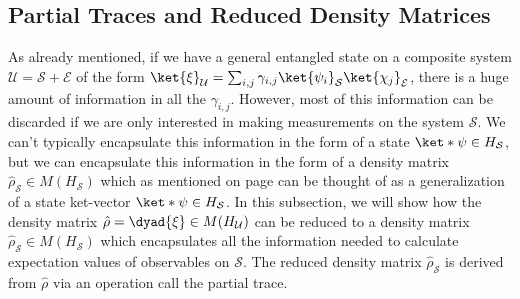     \subsection{Partial Traces and Reduced Density Matrices}
    As already mentioned, if we have a general entangled state on a composite system $\mathcal{U}=\mathcal{S}+\mathcal{E}$ of the form  $\ket{\xi}_\mathcal{U}=\sum_{i,j}\gamma_{i,j}\ket{\psi_i}_\mathcal{S}\ket{\chi_j}_\mathcal{E}$, there is a huge amount of information in all the $\gamma_{i,j}$. However, most of this information can be discarded if we are only interested in making measurements on the system $\mathcal{S}$. We can't typically encapsulate this information in the form of a state $\ket*{\psi}\in H_\mathcal{S}$, but we can encapsulate this information in the form of a density matrix $\hat{\rho}_\mathcal{S}\in M(H_\mathcal{S})$ which as mentioned on page \pageref{genket} can be thought of as a generalization of a state ket-vector $\ket*{\psi}\in H_\mathcal{S}$. In this subsection, we will show how the density matrix $\hat{\rho}=\dyad{\xi}\in M(H_\mathcal{U})$ can be reduced to a density matrix $\hat{\rho}_\mathcal{S}\in M(H_\mathcal{S})$ which encapsulates all the information needed to calculate expectation values of observables on $\mathcal{S}$. The reduced density matrix $\hat{\rho}_\mathcal{S}$ is derived from $\hat{\rho}$ via an operation call the partial trace.
    
